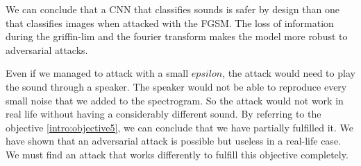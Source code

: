 We can conclude that a CNN that classifies sounds is safer by design than one that classifies images when attacked with the FGSM. The loss of information during the griffin-lim and the fourier transform makes the model more robust to adversarial attacks. 

Even if we managed to attack with a small $epsilon$, the attack would need to play the sound through a speaker. The speaker would not be able to reproduce every small noise that we added to the spectrogram. So the attack would not work in real life without having a considerably different sound.
By referring to the objective \ref{intro:objective5}, we can conclude that we have partially fulfilled it. We have shown that an adversarial attack is possible but useless in a real-life case. We must find an attack that works differently to fulfill this objective completely.
